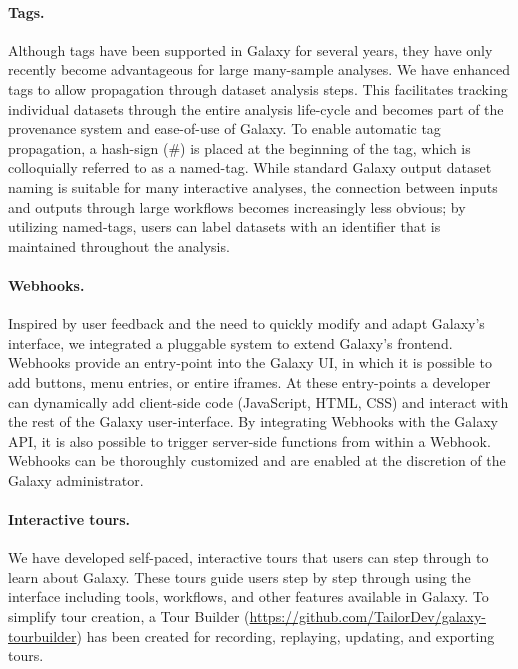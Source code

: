 \paragraph*{Tags.}
Although tags have been supported in Galaxy for several years, they have only recently become advantageous for large many-sample analyses. We have enhanced tags to allow propagation through dataset analysis steps. This facilitates tracking individual datasets through the entire analysis life-cycle and becomes part of the provenance system and ease-of-use of Galaxy. To enable automatic tag propagation, a hash-sign (\#) is placed at the beginning of the tag, which is colloquially referred to as a named-tag. While standard Galaxy output dataset naming is suitable for many interactive analyses, the connection between inputs and outputs through large workflows becomes increasingly less obvious; by utilizing named-tags, users can label datasets with an identifier that is maintained throughout the analysis.

\paragraph*{Webhooks.}
Inspired by user feedback and the need to quickly modify and adapt Galaxy’s interface, we integrated a pluggable system to extend Galaxy’s frontend. Webhooks provide an entry-point into the Galaxy UI, in which it is possible to add buttons, menu entries, or entire iframes. At these entry-points a developer can dynamically add client-side code (JavaScript, HTML, CSS) and interact with the rest of the Galaxy user-interface. By integrating Webhooks with the Galaxy API, it is also possible to trigger server-side functions from within a Webhook. Webhooks can be thoroughly customized and are enabled at the discretion of the Galaxy administrator.

\paragraph*{Interactive tours.}
We have developed self-paced, interactive tours that users can step through to learn about Galaxy. These tours guide users step by step through using the interface including tools, workflows, and other features available in Galaxy. To simplify tour creation, a Tour Builder (\url{https://github.com/TailorDev/galaxy-tourbuilder}) has been created for recording, replaying, updating, and exporting tours.

